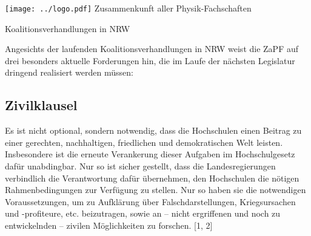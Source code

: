 \documentclass[DIV=calc]{scrartcl}
\begin{document}
\hspace{0.87\textwidth}
\begin{minipage}{120pt}
	\vspace{-1.8cm}
	\texttt{[image: ../logo.pdf]}
	\centering
	\small Zusammenkunft aller Physik-Fachschaften
\end{minipage}

\begin{center}
  \huge{Koalitionsverhandlungen in NRW}\vspace{.25\baselineskip}\\
  \normalsize
\end{center}
\vspace{1cm}






Angesichts der laufenden Koalitionsverhandlungen in NRW weist die ZaPF auf drei besonders aktuelle Forderungen hin, die im Laufe der nächsten Legislatur dringend realisiert werden müssen:
\subsection*{Zivilklausel}
Es ist nicht optional, sondern notwendig, dass die Hochschulen einen Beitrag zu einer gerechten, nachhaltigen, friedlichen und demokratischen Welt leisten. Insbesondere ist die erneute Verankerung dieser Aufgaben im Hochschulgesetz dafür unabdingbar. Nur so ist sicher gestellt, dass die Landesregierungen verbindlich die Verantwortung dafür übernehmen, den Hochschulen die nötigen Rahmenbedingungen zur Verfügung zu stellen. Nur so haben sie die notwendigen Voraussetzungen, um zu Aufklärung über Falschdarstellungen, Kriegsursachen und -profiteure, etc. beizutragen, sowie an – nicht ergriffenen und noch zu entwickelnden – zivilen Möglichkeiten zu forschen. [1, 2]
\end{document}

